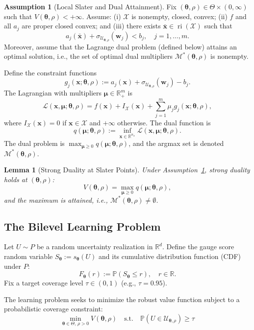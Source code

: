 \documentclass[lettersize,journal]{IEEEtran}
\newcommand{\R}{\mathbb{R}}
\newcommand{\Prob}{\mathbb{P}}
\newcommand{\cU}{\mathcal{U}}
\newcommand{\cX}{\mathcal{X}}
\newcommand{\cL}{\mathcal{L}}
\newcommand{\btheta}{\bm{\theta}}
\newcommand{\bmu}{\bm{\mu}}
\newcommand{\bw}{\bm{w}}
\newcommand{\bx}{\bm{x}}
\DeclareMathOperator{\ri}{ri}
\newcommand{\cM}{\mathcal{M}} %
\newtheorem{lemma}[theorem]{Lemma}
\theoremstyle{definition}
\newtheorem{assumption}{Assumption}
\begin{document}
\begin{assumption}[Local Slater and Dual Attainment]\label{asm:slater}
Fix $(\btheta,\rho)\in\Theta\times(0,\infty)$ such that $V(\btheta,\rho)<+\infty$.
Assume: (i) $\cX$ is nonempty, closed, convex; (ii) $f$ and all $a_j$ are proper closed convex; and (iii) there exists $\bar{\bx} \in \ri(\cX)$ such that
\begin{equation}\label{eq:slater-strict}
a_j(\bar{\bx}) + \sigma_{\cU_{\btheta,\rho}}(\bw_j) < b_j, \quad j = 1,\ldots,m.
\end{equation}
Moreover, assume that the Lagrange dual problem (defined below) attains an optimal solution, i.e., the set of optimal dual multipliers $\cM^*(\btheta,\rho)$ is nonempty.
\end{assumption}

Define the constraint functions
\[
g_j(\bx;\btheta,\rho) := a_j(\bx) + \sigma_{\cU_{\btheta,\rho}}(\bw_j) - b_j.
\]
The Lagrangian with multipliers $\bmu\in\R_+^m$ is
\[
\cL(\bx,\bmu;\btheta,\rho)= f(\bx) + I_{\cX}(\bx) + \sum_{j=1}^m \mu_j g_j(\bx;\btheta,\rho),
\]
where $I_{\cX}(\bx) = 0$ if $\bx \in \cX$ and $+\infty$ otherwise. The dual function is
\[
q(\bmu;\btheta,\rho) := \inf_{\bx\in\R^{n_x}} \cL(\bx,\bmu;\btheta,\rho).
\]
The dual problem is $\max_{\bmu\ge 0} q(\bmu;\btheta,\rho)$, and the argmax set is denoted $\cM^*(\btheta,\rho)$.

\begin{lemma}[Strong Duality at Slater Points]\label{lem:strong-duality}
Under Assumption~\ref{asm:slater}, strong duality holds at $(\btheta,\rho)$:
\[
V(\btheta,\rho)=\max_{\bmu\ge 0} q(\bmu;\btheta,\rho),
\]
and the maximum is attained, i.e., $\cM^*(\btheta,\rho)\neq\emptyset$.
\end{lemma}

\subsection{The Bilevel Learning Problem}

Let $U \sim P$ be a random uncertainty realization in $\R^d$. Define the gauge score random variable $S_{\btheta} := s_{\btheta}(U)$ and its cumulative distribution function (CDF) under $P$:
\begin{equation}
F_{\btheta}(r) := \Prob(S_{\btheta} \leq r), \quad r \in \R.
\end{equation}
Fix a target coverage level $\tau \in (0,1)$ (e.g., $\tau = 0.95$).

The learning problem seeks to minimize the robust value function subject to a probabilistic coverage constraint:
\begin{equation}\label{eq:bilevel}
\boxed{
\min_{\btheta \in \Theta,\, \rho > 0} V(\btheta,\rho) \quad \text{s.t.} \quad \Prob(U \in \cU_{\btheta,\rho}) \geq \tau
}
\end{equation}
\end{document}
